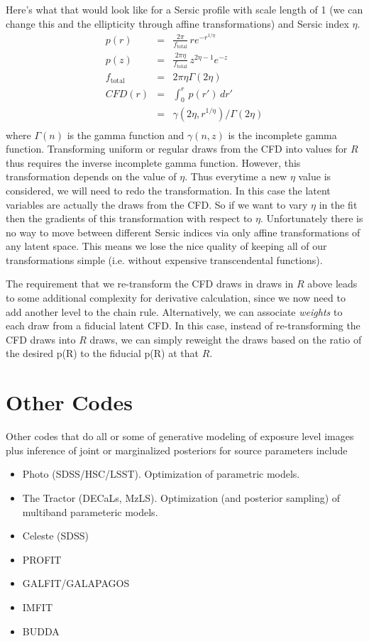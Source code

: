 \documentclass[modern]{aastex62}
\begin{document}
{Here's what that would look like for a Sersic profile with scale length of 1 (we can change this and the ellipticity through affine transformations) and Sersic index $\eta$.
\begin{eqnarray}
 p(r) & = & \frac{2\pi}{f_{\mbox{total}}} \, r e^{-r^{1/\eta}} \nonumber \\
 p(z)  & = & \frac{2\pi \eta }{f_{\mbox{total}}} \, z^{2\eta - 1} e^{-z} \nonumber \\
f_{\mbox{total}} & = & 2\pi\eta \Gamma(2\eta) \nonumber \\ 
CFD(r) & = & \int_0^r \, p(r') \, dr'  \nonumber \\
   & = & \gamma(2\eta, r^{1/\eta}) / \Gamma(2\eta) \\
\end{eqnarray}
where $\Gamma(n)$ is the gamma function and $\gamma(n, z)$ is the incomplete gamma function.
Transforming uniform or regular draws from the CFD into values for $R$ thus requires the inverse incomplete gamma function.
However, this transformation depends on the value of $\eta$.
Thus everytime a new $\eta$ value is considered, we will need to redo the transformation.
In this case the latent variables are actually the draws from the CFD.
So if we want to vary $\eta$ in the fit then the gradients of this transformation with respect to $\eta$.
Unfortunately there is no way to move between different Sersic indices via only affine transformations of any latent space.
This means we lose the nice quality of keeping all of our transformations simple (i.e. without expensive transcendental functions).

The requirement that we re-transform the CFD draws in draws in $R$ above leads to some additional complexity for derivative calculation, 
since we now need to add another level to the chain rule.
Alternatively, we can associate \emph{weights} to each draw from a fiducial latent CFD.
In this case, instead of re-transforming the CFD draws into $R$ draws, 
we can simply reweight the draws based on the ratio of the desired p(R) to the fiducial p(R) at that $R$.


\section{Other Codes}
Other codes that do all or some of generative modeling of exposure level images plus inference of joint or marginalized posteriors for source parameters include
\begin{itemize}
\item Photo (SDSS/HSC/LSST).  Optimization of parametric models.
\item The Tractor (DECaLs, MzLS).  Optimization (and posterior sampling) of multiband parameteric models.
\item Celeste (SDSS)
 \item PROFIT
\item GALFIT/GALAPAGOS
\item IMFIT
\item BUDDA


\end{itemize}}
\end{document}
